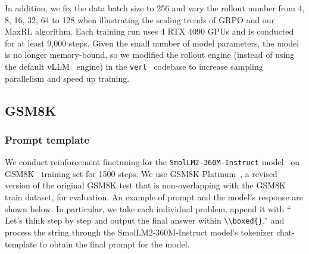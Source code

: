 \documentclass[10pt]{article} %
\begin{document}
In addition, we fix the data batch size to 256 and vary the rollout number from 4, 8, 16, 32, 64 to 128 when illustrating the scaling trends of GRPO and our MaxRL algorithm. Each training run uses 4 RTX 4090 GPUs and is conducted for at least 9{,}000 steps. Given the small number of model parameters, the model is no longer memory-bound, so we modified the rollout engine (instead of using the default vLLM~\citep{kwon2023efficient} engine) in the \texttt{verl}~\citep{zhang2024framework,sheng2024hybridflow} codebase to increase sampling parallelism and speed up training.

\newpage

\subsection{GSM8K} \label{app:gsm8k_task_description}

\subsubsection{Prompt template}

We conduct reinforcement finetuning for the \texttt{SmolLM2-360M-Instruct} model~\citep{allal2025smollm2smolgoesbig} on GSM8K~\citep{cobbe2021trainingverifierssolvemath} training set for 1500 steps. We use GSM8K-Platinum~\citep{vendrow2025largelanguagemodelbenchmarks}, a revised version of the original GSM8K test that is non-overlapping with the GSM8K train dataset, for evaluation. An example of prompt and the model's response are shown below. In particular, we take each individual problem, append it with `` Let's think step by step and output the final answer within \texttt{\textbackslash \textbackslash boxed\{\}}." and process the string through the SmolLM2-360M-Instruct model's tokenizer chat-template to obtain the final prompt for the model.
\end{document}

